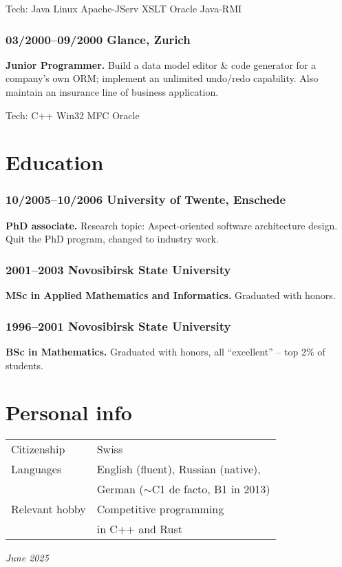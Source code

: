 \documentclass[a4paper, twocolumn, 10pt]{article}
\begin{document}
Tech: Java Linux Apache-JServ XSLT Oracle Java-RMI

\subsubsection*{03/2000--09/2000 Glance, Zurich}

\textbf{Junior Programmer.} Build a data model editor \& code generator for a company's own ORM;
implement an unlimited undo/redo capability. Also maintain an insurance line of business
application.

Tech: C++ Win32 MFC Oracle

\section*{Education}

\subsubsection*{10/2005--10/2006 University of Twente, Enschede}

\textbf{PhD associate.} Research topic: Aspect-oriented software architecture design. Quit the PhD
program, changed to industry work.

\subsubsection*{2001--2003 Novosibirsk State University}

\textbf{MSc in Applied Mathematics and Informatics.} Graduated with honors.

\subsubsection*{1996--2001 Novosibirsk State University}

\textbf{BSc in Mathematics.} Graduated with honors, all ``excellent'' -- top 2\% of students.

\section*{Personal info}

\begin{tabular}{l l}
  \vspace{0.2cm}
  Citizenship & Swiss \\
  Languages & English (fluent), Russian (native), \\
  \vspace{0.2cm}
  & German ($\sim$C1 de facto, B1 in 2013) \\
  Relevant hobby & Competitive programming \\
  \vspace{0.2cm}
  & in C++ and Rust \\
\end{tabular}

\vspace*{\fill}
\hfill \emph{June 2025}
\end{document}
